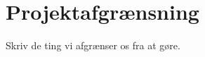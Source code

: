 \chapter{Projektafgrænsning}
\label{Projektafgraensning}
%
Skriv de ting vi afgrænser os fra at gøre. 